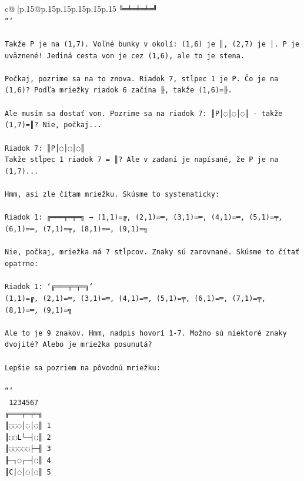 \documentclass{article}
\begin{document}
{\begin{supertabular}{c@{$\;$}|p{.15\linewidth}@{}p{.15\linewidth}p{.15\linewidth}p{.15\linewidth}p{.15\linewidth}p{.15\linewidth}}
{{{\texttt{╚═╧═╧═╧═╝} \\
\texttt{```} \\
\\ 
\texttt{Takže P je na (1,7). Voľné bunky v okolí: (1,6) je ║, (2,7) je │. P je uväznené! Jediná cesta von je cez (1,6), ale to je stena.} \\
\\ 
\texttt{Počkaj, pozrime sa na to znova. Riadok 7, stĺpec 1 je P. Čo je na (1,6)? Podľa mriežky riadok 6 začína ╟, takže (1,6)=╟. } \\
\\ 
\texttt{Ale musím sa dostať von. Pozrime sa na riadok 7: ║P│◌│◌│◌║ {-} takže (1,7)=║? Nie, počkaj... } \\
\\ 
\texttt{Riadok 7: ║P│◌│◌│◌║} \\
\texttt{Takže stĺpec 1 riadok 7 = ║? Ale v zadaní je napísané, že P je na (1,7)... } \\
\\ 
\texttt{Hmm, asi zle čítam mriežku. Skúsme to systematicky:} \\
\\ 
\texttt{Riadok 1: ╔═══╤═╤═╗ → (1,1)=╔, (2,1)=═, (3,1)=═, (4,1)=═, (5,1)=╤, (6,1)=═, (7,1)=╤, (8,1)=═, (9,1)=╗} \\
\\ 
\texttt{Nie, počkaj, mriežka má 7 stĺpcov. Znaky sú zarovnané. Skúsme to čítať opatrne:} \\
\\ 
\texttt{Riadok 1: `╔═══╤═╤═╗`} \\
\texttt{(1,1)=╔, (2,1)=═, (3,1)=═, (4,1)=═, (5,1)=╤, (6,1)=═, (7,1)=╤, (8,1)=═, (9,1)=╗} \\
\\ 
\texttt{Ale to je 9 znakov. Hmm, nadpis hovorí 1{-}7. Možno sú niektoré znaky dvojité? Alebo je mriežka posunutá?} \\
\\ 
\texttt{Lepšie sa pozriem na pôvodnú mriežku:} \\
\\ 
\texttt{```} \\
\texttt{ 1234567} \\
\texttt{╔═══╤═╤═╗} \\
\texttt{║◌◌◌│◌│◌║ 1} \\
\texttt{║◌◌L└─┤◌║ 2} \\
\texttt{║◌◌◌◌◌├─╢ 3} \\
\texttt{╟─┐◌┌─┤◌║ 4} \\
\texttt{║C│◌│◌│◌║ 5} \\
}}}
\end{supertabular}}
\end{document}
